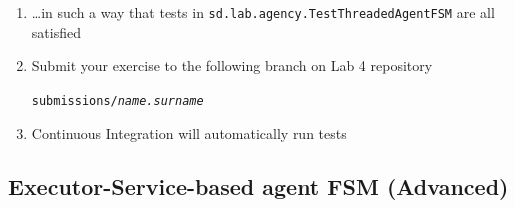 \documentclass[presentation]{beamer}\mode<presentation>{\usetheme{AMSCesenaPurpleAndGold}}
\newcommand{\labN}{4}
\begin{document}
\begin{frame}[c, allowframebreaks]
\begin{enumerate}
        \bigskip

        \item \ldots in such a way that tests in \texttt{sd.lab.agency.\alert{TestThreadedAgentFSM}} are all satisfied

        \bigskip

        \item Submit your exercise to the following branch on Lab \labN{} repository
        \begin{center}
            \texttt{submissions/\textit{name.surname}}
        \end{center}

        \bigskip

        \item Continuous Integration will automatically run tests
    \end{enumerate}

\end{frame}

\startExercise

\subsection{Executor-Service-based agent FSM (Advanced)}
\end{document}
